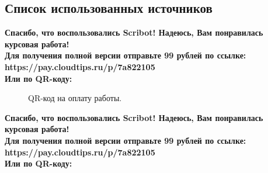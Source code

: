 \documentclass{article}
\begin{document}
\begin{center}
\section{Список использованных источников}
\begin{center}
    \textbf{
        Спасибо, что воспользовались Scribot! Надеюсь, Вам понравилась курсовая работа!\\
        Для получения полной версии отправьте 99 рублей по ссылке:\\
        https://pay.cloudtips.ru/p/7a822105\\
        Или по QR-коду:\\
    }
\end{center}
\begin{figure}[h]
    \caption{QR-код на оплату работы.}
    \label{ris:image}
\end{figure}
\newpage
\begin{center}
    \textbf{
        Спасибо, что воспользовались Scribot! Надеюсь, Вам понравилась курсовая работа!\\
        Для получения полной версии отправьте 99 рублей по ссылке:\\
        https://pay.cloudtips.ru/p/7a822105\\
        Или по QR-коду:\\
}
\end{center}
\end{center}
\end{document}
